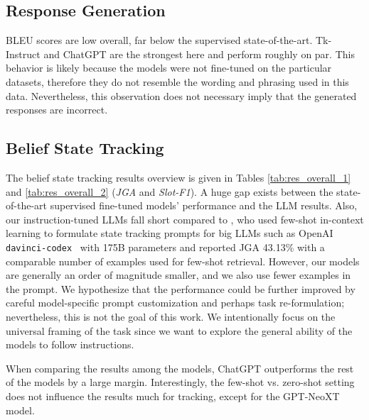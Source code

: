 \subsection{Response Generation}
BLEU scores are low overall, far below the supervised state-of-the-art.
Tk-Instruct and ChatGPT are the strongest here and perform roughly on par.
This behavior is likely because the models were not fine-tuned on the particular datasets, therefore they do not resemble the wording and phrasing used in this data.
Nevertheless, this observation does not necessary imply that the generated responses are incorrect.


\subsection{Belief State Tracking}
\label{subsec:dst}
The belief state tracking results overview is given in Tables \ref{tab:res_overall_1} and \ref{tab:res_overall_2} (\emph{JGA} and \emph{Slot-F1}).
A huge gap exists between the state-of-the-art supervised fine-tuned models' performance and the LLM results.
Also, our instruction-tuned LLMs fall short compared to \citet{hu-etal-2022-context}, who used few-shot in-context learning to formulate state tracking prompts for big LLMs such as OpenAI \texttt{davinci-codex}~\citep{chen2021evaluating} with 175B parameters and reported JGA 43.13\% with a comparable number of examples used for few-shot retrieval.
However, our models are generally an order of magnitude smaller, and we also use fewer examples in the prompt.
We hypothesize that the performance could be further improved by careful model-specific prompt customization and perhaps task re-formulation; nevertheless, this is not the goal of this work.
We intentionally focus on the universal framing of the task since we want to explore the general ability of the models to follow instructions.

When comparing the results among the models, ChatGPT outperforms the rest of the models by a large margin. 
Interestingly, the few-shot vs. zero-shot setting does not influence the results much for tracking, except for the GPT-NeoXT model.

